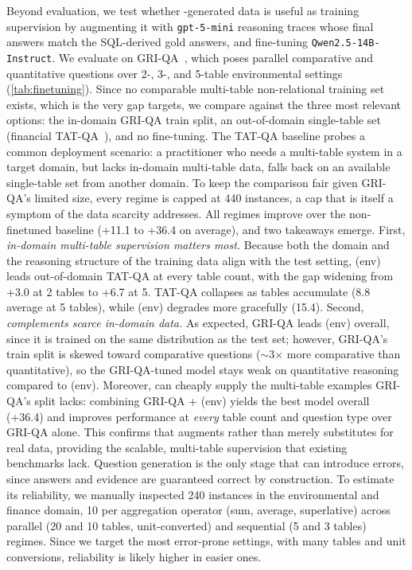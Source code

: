 Beyond evaluation, we test whether \name-generated data is useful as training supervision by augmenting it with \texttt{gpt-5-mini} reasoning traces whose final answers match the SQL-derived gold answers, and fine-tuning \texttt{Qwen2.5-14B-Instruct}. 
We evaluate on GRI-QA~\cite{1.16}, which poses parallel comparative and quantitative questions over 2-, 3-, and 5-table environmental settings (\autoref{tab:finetuning}).
Since no comparable multi-table non-relational training set exists, which is the very gap \name targets, we compare against the three most relevant options: the in-domain GRI-QA train split, an out-of-domain single-table set (financial TAT-QA~\citealp{1.9}), and no fine-tuning. The TAT-QA baseline probes a common deployment scenario: a practitioner who needs a multi-table system in a target domain, but lacks in-domain multi-table data, falls back on an available single-table set from another domain. To keep the comparison fair given GRI-QA's limited size, every regime is capped at 440 instances, a cap that is itself a symptom of the data scarcity \name addresses.
All regimes improve over the non-finetuned baseline (+11.1 to +36.4 on average), and two takeaways emerge. First, \emph{in-domain multi-table supervision matters most.} Because both the domain and the reasoning structure of the training data align with the test setting, \name (env) leads out-of-domain TAT-QA at every table count, with the gap widening from +3.0 at 2 tables to +6.7 at 5. TAT-QA collapses as tables accumulate (8.8 average at 5 tables), while \name (env) degrades more gracefully (15.4). Second, \emph{\name complements scarce in-domain data.} As expected, GRI-QA leads \name (env) overall, since it is trained on the same distribution as the test set; however, GRI-QA's train split is skewed toward comparative questions ($\sim$3$\times$ more comparative than quantitative), so the GRI-QA-tuned model stays weak on quantitative reasoning compared to \name (env). Moreover, \name can cheaply supply the multi-table examples GRI-QA's split lacks: combining GRI-QA + \name (env) yields the best model overall (+36.4) and improves performance at \emph{every} table count and question type over GRI-QA alone. This confirms that \name augments rather than merely substitutes for real data, providing the scalable, multi-table supervision that existing benchmarks lack.
Question generation is the only \name stage that can introduce errors, since answers and evidence are guaranteed correct by construction. To estimate its reliability, we manually inspected 240 instances in the environmental and finance domain, 10 per aggregation operator (sum, average, superlative) across parallel (20 and 10 tables, unit-converted) and sequential (5 and 3 tables) regimes. Since we target the most error-prone settings, with many tables and unit conversions, reliability is likely higher in easier ones. 

